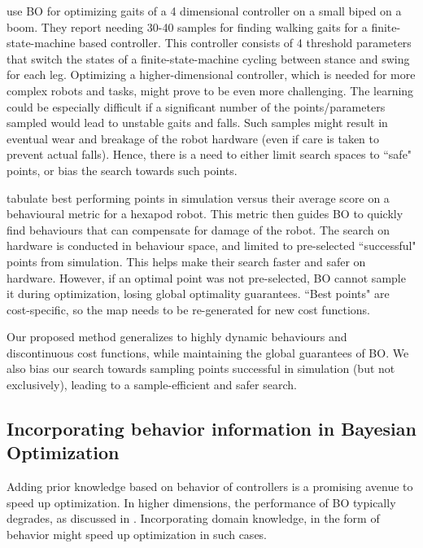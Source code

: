 \cite{calandra2016bayesian} use BO for optimizing gaits of a 4 dimensional controller on a small biped on a boom. They report needing 30-40 samples for finding walking gaits for a finite-state-machine based controller. This controller consists of 4 threshold parameters that switch the states of a finite-state-machine cycling between stance and swing for each leg. Optimizing a higher-dimensional controller, which is needed for more complex robots and tasks, might prove to be even more challenging. The learning could be especially difficult if a significant number of the points/parameters sampled would lead to unstable gaits and falls. Such samples might result in eventual wear and breakage of the robot hardware (even if care is taken to prevent actual falls). Hence, there is a need to either limit search spaces to ``safe" points, or bias the search towards such points. 

\cite{cully2015robots} tabulate best performing points in simulation versus their average score on a behavioural metric for a hexapod robot. This metric then guides BO to quickly find behaviours that can compensate for damage of the robot. The search on hardware is conducted in behaviour space, and limited to pre-selected ``successful" points from simulation.  This helps make their search faster and safer on hardware.   However, if an optimal point was not pre-selected,  BO cannot sample it during optimization, losing global optimality guarantees.  ``Best points" are cost-specific, so the map needs to be re-generated for new cost functions.

Our proposed method generalizes to highly dynamic behaviours and discontinuous cost functions, while maintaining the global guarantees of BO. We also bias our search towards sampling points successful in simulation (but not exclusively), leading to a sample-efficient and safer search.

\subsection{Incorporating behavior information in Bayesian Optimization}

Adding prior knowledge based on behavior of controllers is a promising avenue to speed up optimization. In higher dimensions, the performance of BO typically degrades, as discussed in \cite{localBO17}. Incorporating domain knowledge, in the form of behavior might speed up optimization in such cases.

